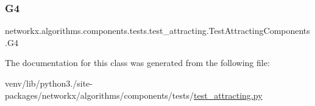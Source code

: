 \subsubsection{\texorpdfstring{G4}{G4}}
{\footnotesize\ttfamily networkx.\+algorithms.\+components.\+tests.\+test\+\_\+attracting.\+Test\+Attracting\+Components.\+G4}



The documentation for this class was generated from the following file\+:\begin{DoxyCompactItemize}
\item 
venv/lib/python3./site-\/packages/networkx/algorithms/components/tests/\hyperlink{test__attracting_8py}{test\+\_\+attracting.\+py}\end{DoxyCompactItemize}
